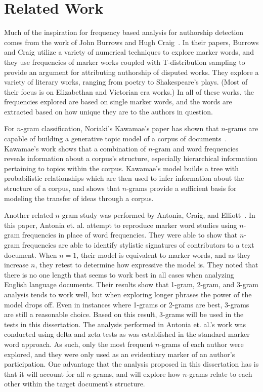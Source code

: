\documentclass[../ut-dissertation.tex]{subfiles}
\begin{document}
\section{Related Work}
Much of the inspiration for frequency based analysis for authorship
detection comes from the work of John Burrows and Hugh
Craig~\cite{burrows2006, burrows2017, craig2009}.  In their papers,
Burrows and Craig utilize a variety of numerical techniques to explore
marker words, and they use frequencies of marker works coupled with
T-distribution sampling to provide an argument for attributing
authorship of disputed works.  They explore a variety of literary
works, ranging from poetry to Shakespeare's plays.  (Most of their
focus is on Elizabethan and Victorian era works.)  In all of these
works, the frequencies explored are based on single marker words, and
the words are extracted based on how unique they are to the authors in
question.

For $n$-gram classification, Noriaki's Kawamae's paper has shown that
$n$-grams are capable of building a generative topic model of a corpus
of documents~\cite{kawamae2016}.  Kawamae's work shows that a
combination of $n$-gram and word frequencies reveals information about
a corpus's structure, especially hierarchical information pertaining
to topics within the corpus.  Kawamae's model builds a tree with
probabilistic relationships which are then used to infer information
about the structure of a corpus, and shows that $n$-grams provide
a sufficient basis for modeling the transfer of ideas through a corpus.

Another related $n$-gram study was performed by Antonia, Craig, and
Elliott~\cite{antonia2014}.  In this paper, Antonia et. al. attempt to
reproduce marker word studies using $n$-gram frequencies in place of
word frequencies.  They were able to show that $n$-gram frequencies
are able to identify stylistic signatures of contributors to a text
document.  When $n=1$, their model is equivalent to marker words, and
as they increase $n$, they retest to determine how expressive the
model is.  They noted that there is no one length that seems to work
best in all cases when analyzing English language documents.  Their
results show that 1-gram, 2-gram, and 3-gram analysis tends to work
well, but when exploring longer phrases the power of the model drops
off.  Even in instances where 1-grams or 2-grams are best, 3-grams are
still a reasonable choice.  Based on this result, 3-grams will be used
in the tests in this dissertation.  The analysis performed in Antonia
et. al.'s work was conducted using delta and zeta tests as was
established in the standard marker word approach.  As such, only the
most frequent $n$-grams of each author were explored, and they were
only used as an evidentiary marker of an author's participation.  One
advantage that the analysis proposed in this dissertation has is that
it will account for all $n$-grams, and will explore how $n$-grams
relate to each other within the target document's structure.
\end{document}
